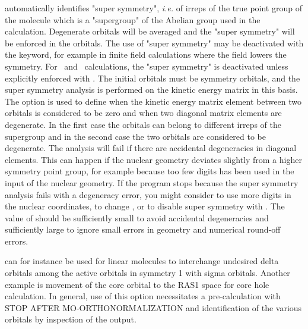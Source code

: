 
{\sir} automatically identifies "super
symmetry", {\it i.e.\/} of irreps of the true point
group of the molecule which is a
"supergroup" of the Abelian group used in the calculation.
Degenerate orbitals will be averaged and the "super
symmetry" will be enforced in the orbitals.
The use of "super symmetry" may be deactivated with the
 keyword, for example in finite field
calculations where the field lowers the symmetry.
For
\aba\ and \resp\ calculations, the "super symmetry" is deactivated
unless explicitly enforced with .
The initial
orbitals must be symmetry orbitals, and the super symmetry
analysis is performed on the kinetic energy matrix in this basis.
The  option is used to define when the kinetic
energy matrix element between two orbitals is considered to be
zero and when two diagonal matrix elements are degenerate. In the
first case the orbitals can belong to different irreps of the
supergroup and in the second case the two orbitals are considered
to be degenerate. The analysis will fail if there are accidental
degeneracies in diagonal elements.  This can happen if the nuclear
geometry deviates slightly from a higher symmetry point group, for
example because too few digits has been used in the input of the
nuclear geometry. If the program stops because the super symmetry
analysis fails with a degeneracy error, you might consider to use
more digits in the nuclear coordinates, to change , or
to disable super symmetry with .  The value of
 should be sufficiently small to avoid accidental
degeneracies and sufficiently large to ignore small errors in
geometry and numerical round-off errors.


 can for instance be used for
linear molecules to interchange
undesired delta orbitals among the active orbitals in symmetry 1 with
sigma orbitals.  Another example is movement of the core orbital to the
RAS1 space for core hole calculation.  In general, use of this option
necessitates a pre-calculation with STOP AFTER MO-ORTHONORMALIZATION and
identification of the various orbitals by inspection of the output.


\pagebreak[3]
\subsection{\label{ref-popinp}}

